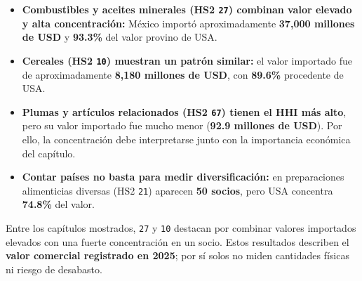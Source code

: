 \documentclass[
]{article}
\providecommand{\tightlist}{%
  \setlength{\itemsep}{0pt}\setlength{\parskip}{0pt}}
\begin{document}
\begin{itemize}
\tightlist
\item
  \textbf{Combustibles y aceites minerales (HS2 \texttt{27}) combinan
  valor elevado y alta concentración:} México importó aproximadamente
  \textbf{37,000 millones de USD} y \textbf{93.3\%} del valor provino de
  USA.
\item
  \textbf{Cereales (HS2 \texttt{10}) muestran un patrón similar:} el
  valor importado fue de aproximadamente \textbf{8,180 millones de USD},
  con \textbf{89.6\%} procedente de USA.
\item
  \textbf{Plumas y artículos relacionados (HS2 \texttt{67}) tienen el
  HHI más alto}, pero su valor importado fue mucho menor (\textbf{92.9
  millones de USD}). Por ello, la concentración debe interpretarse junto
  con la importancia económica del capítulo.
\item
  \textbf{Contar países no basta para medir diversificación:} en
  preparaciones alimenticias diversas (HS2 \texttt{21}) aparecen
  \textbf{50 socios}, pero USA concentra \textbf{74.8\%} del valor.
\end{itemize}

Entre los capítulos mostrados, \texttt{27} y \texttt{10} destacan por
combinar valores importados elevados con una fuerte concentración en un
socio. Estos resultados describen el \textbf{valor comercial registrado
en 2025}; por sí solos no miden cantidades físicas ni riesgo de
desabasto.
\end{document}
